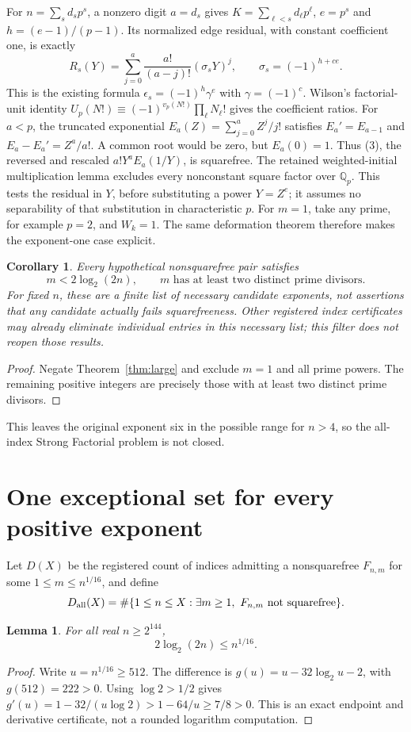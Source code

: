 \documentclass[11pt]{article}
\newtheorem{lemma}[theorem]{Lemma}
\newtheorem{corollary}[theorem]{Corollary}
\newcommand{\Q}{\mathbb Q}
\begin{document}
For $n=\sum_s d_sp^s$, a nonzero digit $a=d_s$ gives $K=\sum_{\ell<s}d_\ell p^\ell$,
$e=p^s$ and $h=(e-1)/(p-1)$.
Its normalized edge residual, with constant coefficient one, is exactly
\[
 R_s(Y)=\sum_{j=0}^a\frac{a!}{(a-j)!}(\sigma_sY)^j,
 \qquad\sigma_s=(-1)^{h+ce}. \tag{3}
\]
This is the existing formula $\epsilon_s=(-1)^h\gamma^e$ with
$\gamma=(-1)^c$. Wilson's factorial-unit identity
$U_p(N!)\equiv(-1)^{v_p(N!)}\prod_\ell N_\ell!$ gives the coefficient ratios.
For $a<p$, the truncated exponential $E_a(Z)=\sum_{j=0}^aZ^j/j!$
satisfies $E_a'=E_{a-1}$ and $E_a-E_a'=Z^a/a!$.
A common root would be zero, but $E_a(0)=1$.
Thus (3), the reversed and rescaled $a!Y^aE_a(1/Y)$, is squarefree.
The retained weighted-initial multiplication lemma excludes every
nonconstant square factor over $\Q_p$.
This tests the residual in $Y$, before substituting a power $Y=Z^e$;
it assumes no separability of that substitution in characteristic $p$.
For $m=1$, take any prime, for example $p=2$, and $W_k=1$.
The same deformation theorem therefore makes the exponent-one case explicit.

\begin{corollary}\label{cor:candidates}
Every hypothetical nonsquarefree pair satisfies
\[
 \boxed{m<2\log_2(2n),\qquad m\text{ has at least two distinct prime divisors}.}
\]
For fixed $n$, these are a finite list of necessary candidate exponents,
not assertions that any candidate actually fails squarefreeness.
Other registered index certificates may already eliminate individual
entries in this necessary list; this filter does not reopen those results.
\end{corollary}
\begin{proof}
Negate Theorem~\ref{thm:large} and exclude $m=1$ and all prime powers.
The remaining positive integers are precisely those with at least two
distinct prime divisors.
\end{proof}
This leaves the original exponent six in the possible range for $n>4$,
so the all-index Strong Factorial problem is not closed.

\section{One exceptional set for every positive exponent}
Let $D(X)$ be the registered count of indices admitting a nonsquarefree
$F_{n,m}$ for some $1\le m\le n^{1/16}$, and define
\[
 D_{\rm all}(X)=\#\{1\le n\le X:\exists m\ge1,\ F_{n,m}\text{ not squarefree}\}.
\]
\begin{lemma}\label{lem:overlap}
For all real $n\ge2^{144}$,
\[
 2\log_2(2n)\le n^{1/16}.
\]
\end{lemma}
\begin{proof}
Write $u=n^{1/16}\ge512$. The difference is
$g(u)=u-32\log_2u-2$, with $g(512)=222>0$.
Using $\log2>1/2$ gives
$g'(u)=1-32/(u\log2)>1-64/u\ge7/8>0$.
This is an exact endpoint and derivative certificate, not a rounded
logarithm computation.
\end{proof}
\end{document}
